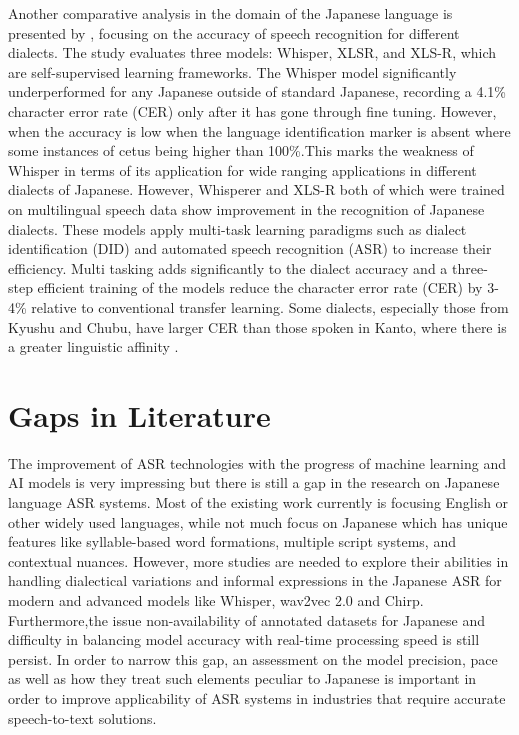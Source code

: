 Another comparative analysis in the domain of the Japanese language is presented by \textcite{takahashi2024comparison}, focusing on the accuracy of speech recognition for different dialects. The study evaluates three models: Whisper, XLSR, and XLS-R, which are self-supervised learning frameworks. The Whisper model significantly underperformed for any Japanese outside of standard Japanese, recording a 4.1\% character error rate (CER) only after it has gone through fine tuning. However, when the accuracy is low when the language identification marker is absent where some instances of cetus being higher than 100\%.This marks the weakness of Whisper in terms of its application for wide ranging applications in different dialects of Japanese. However, Whisperer and XLS-R both of which were trained on multilingual speech data show improvement in the recognition of Japanese dialects. These models apply multi-task learning paradigms such as dialect identification (DID) and automated speech recognition (ASR) to increase their efficiency. Multi tasking adds significantly to the dialect accuracy and a three-step efficient training of the models reduce the character error rate (CER) by 3-4\% relative to conventional transfer learning. Some dialects, especially those from Kyushu and Chubu, have larger CER than those spoken in Kanto, where there is a greater linguistic affinity \parencite{takahashi2024comparison}.

\section{Gaps in Literature}
The improvement of ASR technologies with the progress of machine learning and AI models is very impressing but there is still a gap in the research on Japanese language ASR systems. Most of the existing work currently is focusing English or other widely used languages, while not much focus on Japanese which has unique features like syllable-based word formations, multiple script systems, and contextual nuances. However, more studies are needed to explore their abilities in handling dialectical variations and informal expressions in the Japanese ASR for modern and advanced models like Whisper, wav2vec 2.0 and Chirp. Furthermore,the issue non-availability of annotated datasets for Japanese and difficulty in balancing model accuracy with real-time processing speed is still persist. In order to narrow this gap, an assessment on the  model precision, pace as well as how they treat such elements peculiar to Japanese is important in order to improve applicability of ASR systems in industries that require accurate speech-to-text solutions.

